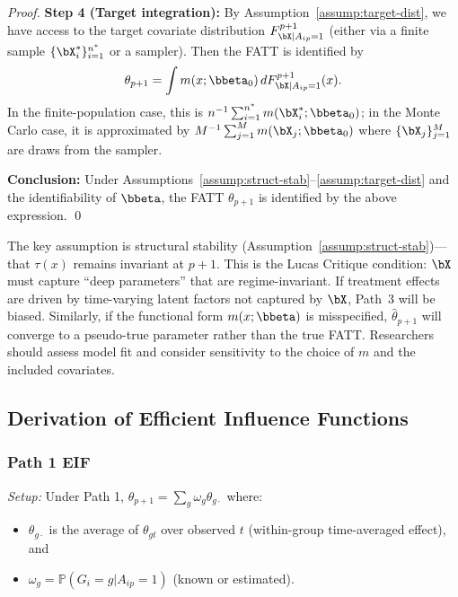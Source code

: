 \documentclass{article}
\renewcommand{\P}{\mathbb{P}}
\begin{document}
\begin{proof}
\textbf{Step 4 (Target integration):} By Assumption~\ref{assump:target-dist}, we have access to the target covariate distribution $F_{\bX | A_{ip}=1}^{p+1}$ (either via a finite sample $\{\bX_i^*\}_{i=1}^{n^*}$ or a sampler). Then the FATT is identified by
\[
\theta_{p+1} = \int m(x;\bbeta_0) \, dF_{\bX | A_{ip}=1}^{p+1}(x).
\]
In the finite-population case, this is $n^{-1}\sum_{i=1}^{n^*} m(\bX_i^*;\bbeta_0)$; in the Monte Carlo case, it is approximated by $M^{-1}\sum_{j=1}^M m(\bX_j;\bbeta_0)$ where $\{\bX_j\}_{j=1}^M$ are draws from the sampler.

\textbf{Conclusion:} Under Assumptions~\ref{assump:struct-stab}--\ref{assump:target-dist} and the identifiability of $\bbeta$, the FATT $\theta_{p+1}$ is identified by the above expression. \qed
\end{proof}

\begin{remark}
The key assumption is structural stability (Assumption~\ref{assump:struct-stab})---that $\tau(x)$ remains invariant at $p+1$. This is the Lucas Critique condition: $\bX$ must capture ``deep parameters'' that are regime-invariant. If treatment effects are driven by time-varying latent factors not captured by $\bX$, Path~3 will be biased. Similarly, if the functional form $m(x;\bbeta)$ is misspecified, $\widehat{\theta}_{p+1}$ will converge to a pseudo-true parameter rather than the true FATT. Researchers should assess model fit and consider sensitivity to the choice of $m$ and the included covariates.
\end{remark}

\subsection{Derivation of Efficient Influence Functions}\label{app:eif}

\subsubsection{Path 1 EIF}\label{app:eif1}

\textit{Setup:} Under Path 1, $\theta_{p+1} = \sum_g \omega_g \theta_{g\cdot}$ where:
\begin{itemize}
\item $\theta_{g\cdot}$ is the average of $\theta_{gt}$ over observed $t$ (within-group time-averaged effect), and
\item $\omega_g = \P(G_i = g | A_{ip} = 1)$ (known or estimated).
\end{itemize}
\end{document}
